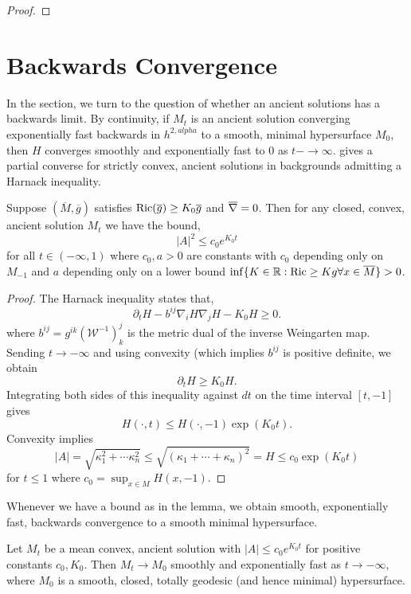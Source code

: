 \documentclass{amsart}
\begin{document}
\begin{proof}

\end{proof}

\section{Backwards Convergence}
\label{sec:backwards}

In the section, we turn to the question of whether an ancient solutions has a backwards limit. By continuity, if \(M_t\) is an ancient solution converging exponentially fast backwards in \(h^{2,alpha}\) to a smooth, minimal hypersurface \(M_0\), then \(H\) converges smoothly and exponentially fast to \(0\) as \(t-\to\infty\).  gives a partial converse for strictly convex, ancient solutions in backgrounds admitting a Harnack inequality.

\begin{lemma}
\label{lem:bounded_sff}
Suppose \((\overline{M}, \overline{g})\) satisfies \(\operatorname{Ric}(\overline{g}) \geq K_0 \overline{g}\) and \(\overline{\nabla}\overline{\rm} = 0\). Then for any closed, convex, ancient solution \(M_t\) we have the bound,
\[
|A|^2 \leq c_0 e^{K_0t}
\]
for all \(t \in (-\infty, 1)\) where \(c_0, a > 0\) are constants with \(c_0\) depending only on \(M_{-1}\) and \(a\) depending only on a lower bound \(\inf \{K \in \mathbb{R} : \operatorname{Ric} \geq K g \forall x \in \overline{M}\} > 0\).
\end{lemma}

\begin{proof}
The Harnack inequality states that,
\[
\partial_t H - b^{ij}\nabla_iH\nabla_jH - K_0 H \geq 0.
\]
where \(b^{ij} = g^{ik} (\mathcal{W}^{-1})^j_k\) is the metric dual of the inverse Weingarten map. Sending \(t \to -\infty\) and using convexity (which implies \(b^{ij}\) is positive definite, we obtain
\[
\partial_t H \geq K_0 H.
\]
Integrating both sides of this inequality against $dt$ on the time interval $[t,-1]$ gives
\[
H(\cdot,t) \leq H(\cdot,-1) \exp(K_0t).
\]
Convexity implies
\[
|A| = \sqrt{\kappa_1^2 + \cdots \kappa_n^2} \leq \sqrt{(\kappa_1 + \cdots + \kappa_n)^2} = H \leq c_0\exp(K_0t)
\]
for $t\le 1$ where $c_0 = \sup_{x\in M} H(x, -1)$.
\end{proof}

Whenever we have a bound as in the lemma, we obtain smooth, exponentially fast, backwards convergence to a smooth minimal hypersurface.

\begin{thm}
\label{thm:backwards_convergence}
Let \(M_t\) be a mean convex, ancient solution with \(|A| \leq c_0 e^{K_0t}\) for positive constants \(c_0, K_0\). Then \(M_t \to M_0\) smoothly and exponentially fast as \(t \to -\infty\), where \(M_0\) is a smooth, closed, totally geodesic (and hence minimal) hypersurface.
\end{thm}
\end{document}
